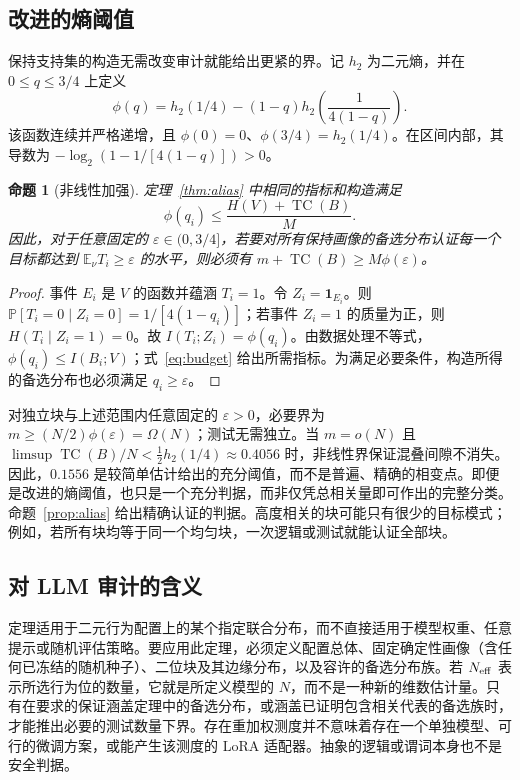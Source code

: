 \documentclass[11pt,a4paper]{article}
\newcommand{\TC}{\operatorname{TC}}
\newcommand{\Prb}{\mathbb P}
\newtheorem{proposition}[theorem]{命题}
\begin{document}
\subsection{改进的熵阈值}
保持支持集的构造无需改变审计就能给出更紧的界。记 $h_2$ 为二元熵，并在 $0\le q\le3/4$ 上定义
\begin{equation}\label{eq:phi}
\phi(q)=h_2(1/4)-(1-q)h_2\!\left(\frac{1}{4(1-q)}\right).
\end{equation}
该函数连续并严格递增，且 $\phi(0)=0$、$\phi(3/4)=h_2(1/4)$。在区间内部，其导数为 $-\log_2(1-1/[4(1-q)])>0$。
\begin{proposition}[非线性加强]\label{prop:nonlinear}
定理~\ref{thm:alias} 中相同的指标和构造满足
\[
\phi(q_i)\le\frac{H(V)+\TC(B)}{M}.
\]
因此，对于任意固定的 $\varepsilon\in(0,3/4]$，若要对所有保持画像的备选分布认证每一个目标都达到 $\mathbb E_\nu T_i\ge\varepsilon$ 的水平，则必须有 $m+\TC(B)\ge M\phi(\varepsilon)$。
\end{proposition}
\begin{proof}
事件 $E_i$ 是 $V$ 的函数并蕴涵 $T_i=1$。令 $Z_i=\mathbf 1_{E_i}$。则 $\Prb[T_i=0\mid Z_i=0]=1/[4(1-q_i)]$；若事件 $Z_i=1$ 的质量为正，则 $H(T_i\mid Z_i=1)=0$。故 $I(T_i;Z_i)=\phi(q_i)$。由数据处理不等式，$\phi(q_i)\le I(B_i;V)$；式~\eqref{eq:budget} 给出所需指标。为满足必要条件，构造所得的备选分布也必须满足 $q_i\ge\varepsilon$。
\end{proof}
对独立块与上述范围内任意固定的 $\varepsilon>0$，必要界为 $m\ge (N/2)\phi(\varepsilon)=\Omega(N)$；测试无需独立。当 $m=o(N)$ 且 $\limsup\TC(B)/N<\tfrac12 h_2(1/4)\approx0.4056$ 时，非线性界保证混叠间隙不消失。因此，$0.1556$ 是较简单估计给出的充分阈值，而不是普遍、精确的相变点。即便是改进的熵阈值，也只是一个充分判据，而非仅凭总相关量即可作出的完整分类。命题~\ref{prop:alias} 给出精确认证的判据。高度相关的块可能只有很少的目标模式；例如，若所有块均等于同一个均匀块，一次逻辑或测试就能认证全部块。

\subsection{对 LLM 审计的含义}
定理适用于二元行为配置上的某个指定联合分布，而不直接适用于模型权重、任意提示或随机评估策略。要应用此定理，必须定义配置总体、固定确定性画像（含任何已冻结的随机种子）、二位块及其边缘分布，以及容许的备选分布族。若 $N_{\rm eff}$ 表示所选行为位的数量，它就是所定义模型的 $N$，而不是一种新的维数估计量。只有在要求的保证涵盖定理中的备选分布，或涵盖已证明包含相关代表的备选族时，才能推出必要的测试数量下界。存在重加权测度并不意味着存在一个单独模型、可行的微调方案，或能产生该测度的 LoRA 适配器。抽象的逻辑或谓词本身也不是安全判据。
\end{document}
